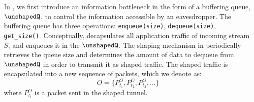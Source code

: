 




In {\sys}, we first introduce an information bottleneck in the form of a
buffering queue, {$\unshapedQ$}, to control the information accessible by an
eavesdropper. The buffering queue has three operations: \texttt{enqueue(size)},
\texttt{dequeue(size)}, \texttt{get\_size()}.
Conceptually, {\sys} decapsulates all application traffic of incoming stream $S$, and enqueues it in the {$\unshapedQ$}.
The shaping mechanism in {\sys} periodically retrieves the queue size and determines the amount of data to dequeue from $\unshapedQ$ in order to transmit it as shaped traffic.
The shaped traffic is encapsulated into a new sequence of packets, which we
denote as:
\begin{equation}\label{equ:stream-segs}
  O = \{P_{t_1}^O, P_{t_2}^O, P_{t_3}^O, \dots\}
\end{equation}
where $P_{t_i}^O$ is a packet sent in the shaped tunnel.

